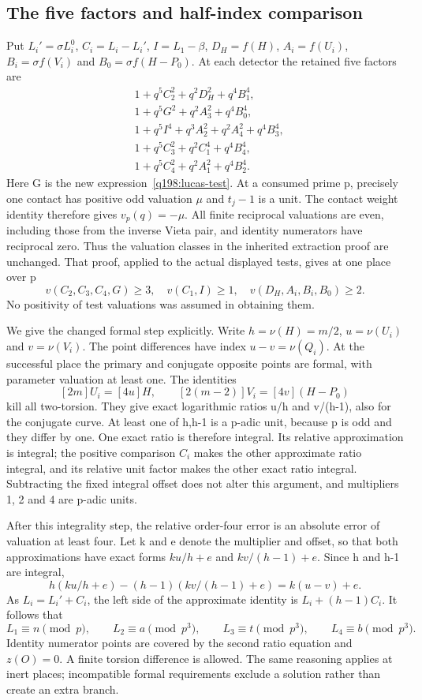 \subsection{The five factors and half-index comparison}
\label{q198:half-index-comparison}
Put $L_i'=\sigma L_i^0$, $C_i=L_i-L_i'$, $I=L_1-\beta$,
$D_H=f(H)$, $A_i=f(U_i)$, $B_i=\sigma f(V_i)$ and
$B_0=\sigma f(H-P_0)$. At each detector the retained five factors are
\begin{align*}
 &1+q^5C_2^2+q^2D_H^2+q^4B_1^4,\\
 &1+q^5G^2+q^2A_3^2+q^4B_0^4,\\
 &1+q^5I^4+q^3A_2^2+q^2A_4^2+q^4B_3^4,\\
 &1+q^5C_3^2+q^2C_1^4+q^4B_4^4,\\
 &1+q^5C_4^2+q^2A_1^2+q^4B_2^4.
\end{align*}
Here G is the new expression~\eqref{q198:lucas-test}.
At a consumed prime p, precisely one contact has positive odd
valuation $\mu$ and $t_j-1$ is a unit. The contact weight identity
therefore gives $v_p(q)=-\mu$.
All finite reciprocal valuations are even, including those from
the inverse Vieta pair, and identity numerators have reciprocal zero.
Thus the valuation classes in the inherited extraction proof are
unchanged. That proof, applied to the actual displayed tests, gives
at one place over p
\[
 v(C_2,C_3,C_4,G)\ge3,\quad v(C_1,I)\ge1,\quad
 v(D_H,A_i,B_i,B_0)\ge2.
\]
No positivity of test valuations was assumed in obtaining them.

We give the changed formal step explicitly. Write
$h=\nu(H)=m/2$, $u=\nu(U_i)$ and $v=\nu(V_i)$.
The point differences have index $u-v=\nu(Q_i)$.
At the successful place the primary and conjugate opposite points
are formal, with parameter valuation at least one. The identities
\[
 [2m]U_i=[4u]H,\qquad
 [2(m-2)]V_i=[4v](H-P_0)
\]
kill all two-torsion. They give exact logarithmic ratios u/h and
v/(h-1), also for the conjugate curve. At least one of h,h-1 is a
p-adic unit, because p is odd and they differ by one. One exact
ratio is therefore integral. Its relative approximation is integral;
the positive comparison $C_i$ makes the other approximate ratio
integral, and its relative unit factor makes the other exact ratio
integral. Subtracting the fixed integral offset does not alter this
argument, and multipliers 1, 2 and 4 are p-adic units.

After this integrality step, the relative order-four error is an
absolute error of valuation at least four. Let k and e denote the
multiplier and offset, so that both approximations have exact forms
$ku/h+e$ and $kv/(h-1)+e$. Since h and h-1 are integral,
\[
 h(ku/h+e)-(h-1)(kv/(h-1)+e)=k(u-v)+e.
\]
As $L_i=L_i'+C_i$, the left side of the approximate identity is
$L_i+(h-1)C_i$. It follows that
\[
 L_1\equiv n\pmod p,\qquad L_2\equiv a\pmod{p^3},\qquad
 L_3\equiv t\pmod{p^3},\qquad L_4\equiv b\pmod{p^3}.
\]
Identity numerator points are covered by the second ratio equation
and $z(O)=0$. A finite torsion difference is allowed. The same
reasoning applies at inert places; incompatible formal requirements
exclude a solution rather than create an extra branch.

